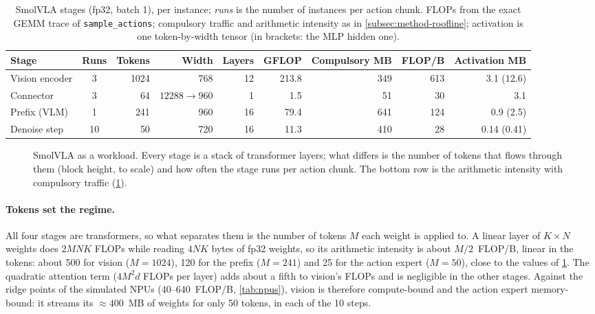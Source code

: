 \begin{table}[tp]
\centering
\small
\caption{SmolVLA stages (fp32, batch 1), per instance; \emph{runs} is the number of instances per action chunk. FLOPs from the exact GEMM trace of \texttt{sample\_actions}; compulsory traffic and arithmetic intensity as in \cref{subsec:method-roofline}; activation is one token-by-width tensor (in brackets: the MLP hidden one).}
\label{tab:stages}
\setlength{\tabcolsep}{4pt}
\begin{tabular}{l c r r r r r r r}
\toprule
Stage & Runs & Tokens & Width & Layers & GFLOP & Compulsory MB & FLOP/B & Activation MB \\
\midrule
Vision encoder & 3 & 1024 & 768 & 12 & 213.8 & 349 & 613 & 3.1 (12.6) \\
Connector & 3 & 64 & $12288{\to}960$ & 1 & 1.5 & 51 & 30 & 3.1 \\
Prefix (VLM) & 1 & 241 & 960 & 16 & 79.4 & 641 & 124 & 0.9 (2.5) \\
Denoise step & 10 & 50 & 720 & 16 & 11.3 & 410 & 28 & 0.14 (0.41) \\
\bottomrule
\end{tabular}
\end{table}

\begin{figure}[tp]
\centering
\resizebox{\textwidth}{!}{}
\caption{SmolVLA as a workload. Every stage is a stack of transformer layers; what differs is the number of tokens that flows through them (block height, to scale) and how often the stage runs per action chunk. The bottom row is the arithmetic intensity with compulsory traffic (\cref{tab:stages}).}
\label{fig:smolvla-workload}
\end{figure}

\paragraph{Tokens set the regime.} All four stages are transformers, so what separates them is the number of tokens $M$ each weight is applied to. A linear layer of $K{\times}N$ weights does $2MNK$ FLOPs while reading $4NK$ bytes of fp32 weights, so its arithmetic intensity is about $M/2$~FLOP/B, linear in the tokens: about 500 for vision ($M=1024$), 120 for the prefix ($M=241$) and 25 for the action expert ($M=50$), close to the values of \cref{tab:stages}. The quadratic attention term ($4M^2d$ FLOPs per layer) adds about a fifth to vision's FLOPs and is negligible in the other stages. Against the ridge points of the simulated NPUs (40--640~FLOP/B, \cref{tab:npus}), vision is therefore compute-bound and the action expert memory-bound: it streams its ${\approx}400$~MB of weights for only 50 tokens, in each of the 10 steps.

